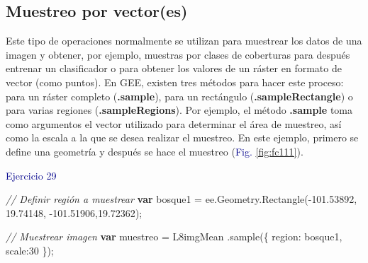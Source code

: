 \documentclass[
  12pt,
  letterpaper,
  twoside]{book}
\newenvironment{Shaded}{\begin{snugshade}}{\end{snugshade}}
\newcommand{\AttributeTok}[1]{\textcolor[rgb]{0.48,0.12,0.64}{#1}}
\newcommand{\CommentTok}[1]{\textcolor[rgb]{0.24,0.58,0.00}{\textit{#1}}}
\newcommand{\DataTypeTok}[1]{\textcolor[rgb]{0.00,0.00,0.00}{#1}}
\newcommand{\DecValTok}[1]{\textcolor[rgb]{0.28,0.53,0.93}{#1}}
\newcommand{\FloatTok}[1]{\textcolor[rgb]{0.28,0.53,0.93}{#1}}
\newcommand{\FunctionTok}[1]{\textcolor[rgb]{0.48,0.12,0.64}{#1}}
\newcommand{\KeywordTok}[1]{\textcolor[rgb]{0.00,0.00,0.00}{\textbf{#1}}}
\newcommand{\NormalTok}[1]{#1}
\newcommand{\OperatorTok}[1]{\textcolor[rgb]{0.00,0.00,0.00}{#1}}
\newcommand\boldpurple[1]{\textcolor{darkpurple}{\textbf{#1}}}
\begin{document}
\hypertarget{muestreo-por-vectores}{%
\subsection*{Muestreo por vector(es)}\label{muestreo-por-vectores}}

   Este tipo
de operaciones normalmente se utilizan para muestrear los datos de una
imagen y obtener, por ejemplo, muestras por clases de coberturas para
después entrenar un clasificador o para obtener los valores de un ráster
en formato de vector (como puntos). En GEE, existen tres métodos para
hacer este proceso: para un ráster completo (\boldpurple{.sample}), para un
rectángulo (\boldpurple{.sampleRectangle}) o para varias regiones
(\boldpurple{.sampleRegions}). Por ejemplo, el método \boldpurple{.sample} toma como
argumentos el vector utilizado para determinar el área de muestreo, así
como la escala a la que se desea realizar el muestreo. En este ejemplo,
primero se define una geometría y después se hace el muestreo
(\textcolor{darkblue}{Fig.} \ref{fig:fc111}).

\textcolor{darkblue}{Ejercicio 29}

\begin{Shaded}
\begin{Highlighting}[]
\CommentTok{// Definir región a muestrear}
\KeywordTok{var}\NormalTok{ bosque1 }\OperatorTok{=}\NormalTok{ ee}\OperatorTok{.}\AttributeTok{Geometry}\OperatorTok{.}\FunctionTok{Rectangle}\NormalTok{(}\OperatorTok{{-}}\FloatTok{101.53892}\OperatorTok{,} \FloatTok{19.74148}\OperatorTok{,} 
  \OperatorTok{{-}}\FloatTok{101.51906}\OperatorTok{,}\FloatTok{19.72362}\NormalTok{)}\OperatorTok{;}
\end{Highlighting}
\end{Shaded}

\begin{Shaded}
\begin{Highlighting}[]
\CommentTok{// Muestrear imagen}
\KeywordTok{var}\NormalTok{ muestreo }\OperatorTok{=}\NormalTok{ L8imgMean}
  \OperatorTok{.}\FunctionTok{sample}\NormalTok{(\{}
    \DataTypeTok{region}\OperatorTok{:}\NormalTok{ bosque1}\OperatorTok{,}
    \DataTypeTok{scale}\OperatorTok{:}\DecValTok{30}
\NormalTok{  \})}\OperatorTok{;}
\end{Highlighting}
\end{Shaded}
\end{document}
